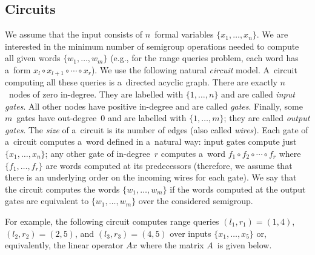 \documentclass[a4paper,UKenglish,cleveref, autoref]{lipics-v2019}
\begin{document}
\subsection{Circuits}\label{subsec:circuits}
We assume that the input consists of $n$~formal variables
$\{x_1, \dotsc, x_n\}$. We are interested in the minimum number of semigroup
operations needed to compute all given words $\{w_1, \dotsc, w_m\}$ (e.g., for
the range queries problem, each word has a~form $x_l\circ x_{l+1}\circ \dotsb \circ x_r$). We use
the following natural {\em circuit} model. A~circuit computing all these queries
is a~directed acyclic graph. There are exactly $n$~nodes of zero in-degree. They
are labelled with $\{1, \dotsc, n\}$ and are called {\em input gates}. All
other nodes have positive in-degree and are called {\em gates}. Finally, some
$m$~gates have out-degree~0 and are labelled with $\{1, \dotsc, m\}$; they are called {\em output gates}. The
{\em size} of a~circuit is its number of edges (also called {\em wires}). Each
gate of a~circuit computes a~word defined in a~natural way: input gates compute
just $\{x_1, \dotsc, x_n\}$; any other gate of in-degree~$r$ computes a~word
$f_1 \circ f_2 \circ \dotsb \circ f_r$ where $\{f_1, \dotsc, f_r\}$ are words
computed at its predecessors (therefore, we assume that there is an underlying
order on the incoming wires for each gate). We say that the circuit computes the
words $\{w_1, \dotsc, w_m\}$ if the words computed at the output gates are
equivalent to $\{w_1, \dotsc, w_m\}$ over the considered semigroup.

For example, the following circuit computes range queries
$(l_1,r_1)=(1,4)$,
$(l_2,r_2)=(2,5)$, and
$(l_3,r_3)=(4,5)$
over inputs $\{x_1, \dotsc, x_5\}$ or, equivalently, the
linear operator $Ax$ where the matrix $A$~is given below.

\begin{center}
\end{center}
\end{document}
